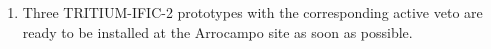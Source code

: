 \begin{enumerate}
\item{} Three TRITIUM-IFIC-2 prototypes with the corresponding active veto are ready to be installed at the Arrocampo site as soon as possible.


\end{enumerate}


